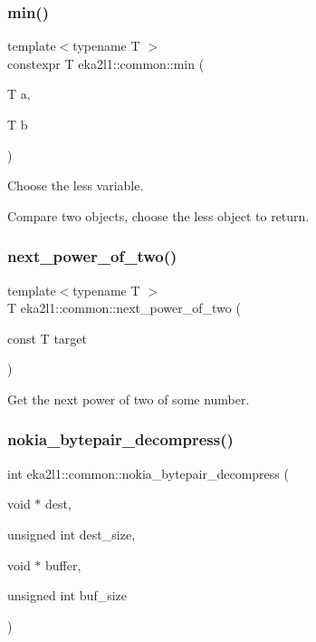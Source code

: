 \subsubsection{\texorpdfstring{min()}{min()}}
{\footnotesize\ttfamily template$<$typename T $>$ \\
constexpr T eka2l1\+::common\+::min (\begin{DoxyParamCaption}\item[{T}]{a,  }\item[{T}]{b }\end{DoxyParamCaption})}



Choose the less variable. 

Compare two objects, choose the less object to return. \mbox{\label{namespaceeka2l1_1_1common_a1e7ad36590bfb9a8891308b102cb5225}} 
\subsubsection{\texorpdfstring{next\+\_\+power\+\_\+of\+\_\+two()}{next\_power\_of\_two()}}
{\footnotesize\ttfamily template$<$typename T $>$ \\
T eka2l1\+::common\+::next\+\_\+power\+\_\+of\+\_\+two (\begin{DoxyParamCaption}\item[{const T}]{target }\end{DoxyParamCaption})}

Get the next power of two of some number. \mbox{\label{namespaceeka2l1_1_1common_ac31c458babed53facf21069ec82d22e9}} 
\subsubsection{\texorpdfstring{nokia\+\_\+bytepair\+\_\+decompress()}{nokia\_bytepair\_decompress()}}
{\footnotesize\ttfamily int eka2l1\+::common\+::nokia\+\_\+bytepair\+\_\+decompress (\begin{DoxyParamCaption}\item[{void $\ast$}]{dest,  }\item[{unsigned int}]{dest\+\_\+size,  }\item[{void $\ast$}]{buffer,  }\item[{unsigned int}]{buf\+\_\+size }\end{DoxyParamCaption})}




